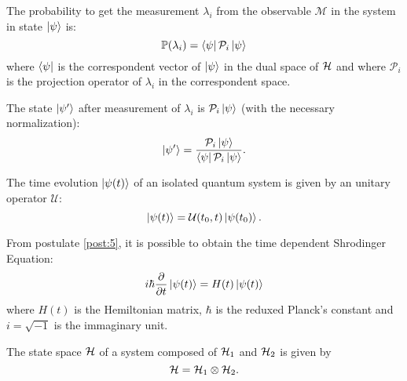     \begin{postulate}
        The probability to get the measurement $\lambda_i$ from the observable 
        $\mathcal{M}$ in the system in state $\ket{\psi}$ is:
        \begin{equation*}
            \mathbb{P}(\lambda_i)=\bra{\psi}\mathcal{P}_i\ket{\psi}
        \end{equation*}
        where $\bra{\psi}$ is the correspondent vector of $\ket{\psi}$ in the 
        dual space of $\mathcal{H}$ and where $\mathcal{P}_i$ is the projection operator
        of $\lambda_i$ in the correspondent space.
        \label{post:3}
    \end{postulate}

    \begin{postulate}
        The state $\ket{\psi'}$ after measurement of $\lambda_i$ is $\mathcal{P}_i\ket{\psi}$ (with the
        necessary normalization):
        \begin{equation*}
            \ket{\psi'}=\frac{\mathcal{P}_i\ket{\psi}}{\bra{\psi}\mathcal{P}_i\ket{\psi}}.
        \end{equation*}
        \label{post:4}
    \end{postulate}

    \begin{postulate}
        The time evolution $\ket{\psi(t)}$ of an isolated quantum system is given by an unitary operator
        $\mathcal{U}$:
        \begin{equation*}
            \ket{\psi(t)}=\mathcal{U}(t_0,t)\ket{\psi(t_0)}.
        \end{equation*}
        \label{post:5}
    \end{postulate}
    \begin{observation*}
        From postulate \ref{post:5}, it is possible to obtain the time dependent Shrodinger Equation:
        \begin{equation*}
            i\hbar\partialderivative{}{t}\ket{\psi(t)}=H(t)\ket{\psi(t)}
        \end{equation*}
        where $H(t)$ is the Hemiltonian matrix, $\hbar$ is the reduxed Planck's constant and $i=\sqrt{-1}$
        is the immaginary unit.
    \end{observation*}

    \begin{postulate}
        The state space $\mathcal{H}$ of a system composed of $\mathcal{H}_1$ and $\mathcal{H}_2$ is given by
        \begin{equation*}
            \mathcal{H}=\mathcal{H}_1\otimes\mathcal{H}_2.
        \end{equation*}
        \label{post:6}
    \end{postulate}

